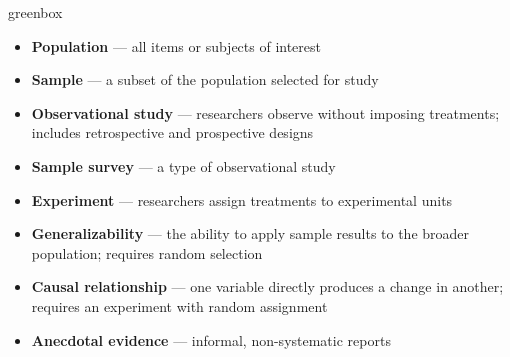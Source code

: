 \documentclass[10pt]{article}
\begin{document}
\begin{skillbox}{greenbox}
\begin{minipage}[t]{0.48\linewidth}
    \begin{itemize}
        \item \textbf{Population} --- all items or subjects of interest
        \item \textbf{Sample} --- a subset of the population selected for study
        \item \textbf{Observational study} --- researchers observe without imposing
              treatments; includes retrospective and prospective designs
        \item \textbf{Sample survey} --- a type of observational study
    \end{itemize}
\end{minipage}
\hfill
\begin{minipage}[t]{0.48\linewidth}
    \begin{itemize}
        \item \textbf{Experiment} --- researchers assign treatments to experimental units
        \item \textbf{Generalizability} --- the ability to apply sample results to the
              broader population; requires random selection
        \item \textbf{Causal relationship} --- one variable directly produces a change in
              another; requires an experiment with random assignment
        \item \textbf{Anecdotal evidence} --- informal, non-systematic reports
    \end{itemize}
\end{minipage}
\end{skillbox}
\end{document}
